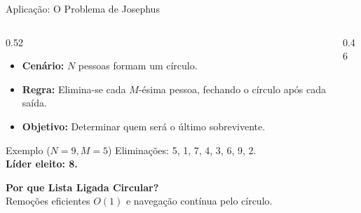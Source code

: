 \documentclass[aspectratio=169]{beamer}
\begin{document}
\begin{frame}[shrink]{Aplicação: O Problema de Josephus}
    \begin{columns}[T]
        \begin{column}{0.52\textwidth}
            \begin{itemize}
                \item \textbf{Cenário:} $N$ pessoas formam um círculo.
                \item \textbf{Regra:} Elimina-se cada $M$-ésima pessoa, fechando o círculo após cada saída.
                \item \textbf{Objetivo:} Determinar quem será o último sobrevivente.
            \end{itemize}

            \begin{exampleblock}{Exemplo ($N=9, M=5$)}
                Eliminações: 5, 1, 7, 4, 3, 6, 9, 2.\\
                \textbf{Líder eleito: 8.}
            \end{exampleblock}

            \vspace{0.2cm}
            {\small \textbf{Por que Lista Ligada Circular?}}\\
            {\scriptsize Remoções eficientes $O(1)$ e navegação contínua pelo círculo.}
        \end{column}
        \begin{column}{0.46\textwidth}
            \centering
        \end{column}
    \end{columns}
\end{frame}
\end{document}
